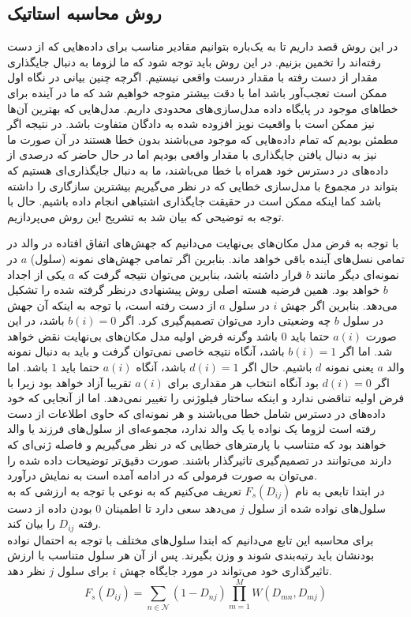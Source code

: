 \subsection{روش محاسبه استاتیک}
در این روش قصد داریم تا به یک‌باره بتوانیم مقادیر مناسب برای داده‌هایی که از دست رفته‌اند را تخمین بزنیم. در این روش باید توجه شود که ما لزوما به دنبال جایگذاری مقدار از دست رفته با مقدار درست واقعی نیستیم. اگرچه چنین بیانی در نگاه اول ممکن است تعجب‌آور باشد اما با دقت بیشتر متوجه خواهیم شد که ما در آینده برای خطاهای موجود در پایگاه داده مدل‌سازی‌های محدودی داریم. مدل‌هایی که بهترین آن‌ها نیز ممکن است با واقعیت نویز افزوده شده به دادگان متفاوت باشد. در نتیجه اگر مطمئن بودیم که تمام داده‌هایی که موجود می‌باشند بدون خطا هستند در آن صورت ما نیز به دنبال یافتن جایگذاری با مقدار واقعی بودیم اما در حال حاضر که درصدی از داده‌های در دسترس خود همراه با خطا می‌باشند، ما به دنبال جایگذاری‌ای هستیم که بتواند در مجموع با مدل‌سازی خطایی که در نظر می‌گیریم بیشترین سازگاری را داشته باشد کما اینکه ممکن است در حقیقت جایگذاری اشتباهی انجام داده باشیم. حال با توجه به توضیحی که بیان شد به تشریح این روش می‌پردازیم.

با توجه به فرض مدل مکان‌های بی‌نهایت می‌دانیم که جهش‌های اتفاق افتاده در والد در تمامی نسل‌های آینده باقی خواهد ماند. بنابرین اگر تمامی جهش‌های نمونه (سلول) $a$ در نمونه‌ای دیگر مانند $b$ قرار داشته باشد، بنابرین می‌توان نتیجه گرفت که $a$ یکی از اجداد $b$ خواهد بود. همین فرضیه هسته اصلی روش پیشنهادی درنظر گرفته شده را تشکیل می‌دهد. بنابرین اگر جهش $i$ در سلول $a$ از دست رفته است، با توجه به اینکه آن جهش در سلول $b$ چه وضعیتی دارد می‌توان تصمیم‌گیری کرد. اگر $b(i)=0$ باشد، در این صورت $a(i)$ حتما باید $0$ باشد وگرنه فرض اولیه مدل مکان‌های بی‌نهایت نقض خواهد شد. اما اگر $b(i)=1$ باشد، آنگاه نتیجه خاصی نمی‌توان گرفت و باید به دنبال نمونه والد $a$ یعنی نمونه $d$ باشیم. حال اگر $d(i)=1$ باشد، آنگاه $a(i)$ حتما باید $1$ باشد. اما اگر $d(i)=0$ بود آنگاه انتخاب هر مقداری برای $a(i)$ تقریبا آزاد خواهد بود زیرا با فرض اولیه تناقضی ندارد و اینکه ساختار فیلوژنی را تغییر نمی‌دهد. اما از آنجایی که  خود داده‌های در دسترس شامل خطا می‌باشند و هر نمونه‌ای که حاوی اطلاعات از دست رفته است لزوما یک نواده یا یک والد ندارد، مجموعه‌ای از سلول‌های فرزند یا والد خواهند بود که متناسب با پارمترهای خطایی که در نظر می‌گیریم و فاصله ژنی‌ای که دارند می‌توانند در تصمیم‌گیری تاثیرگذار باشند. صورت دقیق‌تر توضیحات داده شده را می‌توان به صورت فرمولی که در ادامه آمده است به نمایش درآورد.
\\
در ابتدا تابعی به نام $F_s(D_{ij})$ تعریف می‌کنیم که به نوعی با توجه به ارزشی که به سلول‌های نواده شده از سلول $j$ می‌دهد سعی دارد تا اطمینان $0$ بودن داده از دست رفته $D_{ij}$ را بیان کند.
\\
برای محاسبه این تابع می‌دانیم که ابتدا سلول‌های مختلف با توجه به احتمال نواده بودنشان باید رتبه‌بندی شوند و وزن بگیرند. پس از آن  هر سلول متناسب با ارزش تاثیرگذاری خود می‌تواند در مورد جایگاه جهش $i$ برای سلول $j$ نظر دهد.
\begin{equation}
	F_s(D_{ij}) = \sum_{n \in \mathcal{N}}  (1-D_{nj})  \prod_{m=1}^{M} W(D_{mn}, D_{mj})
	\label{eq:ch_pm:F_s_simple}
\end{equation}

